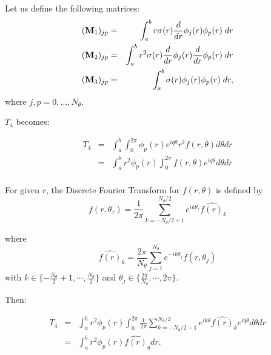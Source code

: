 Let us define the following matrices:
\begin{eqnarray}
({\bf M}_1)_{jp} & = & \int_a^b r \sigma(r) \frac{d}{dr} \phi_j(r) \phi_p(r) \;dr  \\
({\bf M}_2)_{jp} & = & \int_a^b r^2 \sigma(r) \frac{d}{dr} \phi_j(r) \frac{d}{dr} \phi_p(r) \;dr  \\
({\bf M}_3)_{jp} & = & \int_a^b \sigma(r) \phi_j(r) \phi_p(r) \; dr,
\end{eqnarray}
where $j, p = 0, \ldots, N_\theta$.

$T_4$ becomes:

\begin{eqnarray}
T_4 &=& \int_a^b \int_0^{2\pi} \phi_p(r) e^{iq\theta} r^2 f(r,\theta) d\theta dr \\
    &=& \int_a^b r^2\phi_p(r) \int_0^{2\pi} f(r,\theta) e^{iq\theta} d\theta dr \\
\end{eqnarray}

For given $r$, the Discrete Fourier Transform for $f(r, \theta)$ is defined by
\begin{equation}
f(r, \theta_\tau) = \frac{1}{2\pi} \sum_{k=-N_\theta/2+1}^{N_\theta/2} e^{ik\theta_\tau} \widehat{f(r)}_k
\end{equation}

where
\begin{equation}
\widehat{f(r)}_k = \frac{2\pi}{N_\theta} \sum_{j=1}^{N_\theta} e^{-ik\theta_j} f(r, \theta_j)
\end{equation}
with $ k \in \{-\frac{N_\theta}{2}+1, \cdots, \frac{N_\theta}{2}\}$ and $\theta_j \in \{ \frac{2\pi}{N_\theta}, \cdots, 2\pi  \}$.

Then:
\begin{center}
\begin{eqnarray}
T_4&=& \int_a^b r^2\phi_p(r) \int_0^{2\pi} \frac{1}{2\pi} \sum_{k=-N_\theta/2+1}^{N_\theta/2} e^{ik\theta} \widehat{f(r)}_k e^{iq\theta} d\theta dr \\
&=& \int_a^b r^2\phi_p(r) \widehat{f(r)}_q dr.
\end{eqnarray}
\end{center}


